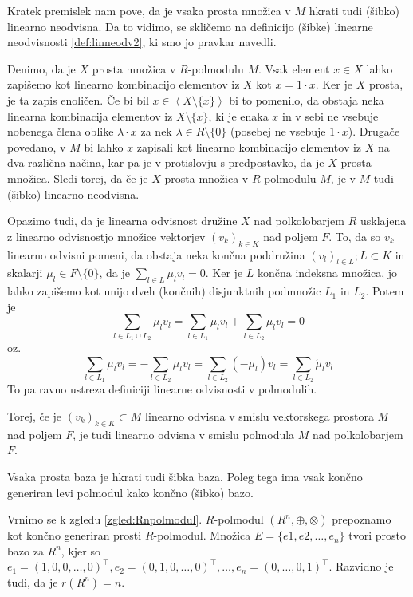 \documentclass[mat1]{fmfdelo}
\newcommand{\Gen}[1]{\ensuremath{\left<{#1}\right>}}
\begin{document}
Kratek premislek nam pove, da je vsaka prosta množica v $M$ hkrati tudi (šibko) linearno neodvisna. Da to vidimo, se skličemo na definicijo (šibke) linearne neodvisnosti \ref{def:linneodv2}, ki smo jo pravkar navedli.

Denimo, da je $X$ prosta množica v $R$-polmodulu $M$. Vsak element $x\in X$ lahko zapišemo kot linearno kombinacijo elementov iz $X$ kot $x = 1\cdot x$. Ker je $X$ prosta, je ta zapis enoličen. Če bi bil $x \in\Gen{X\setminus\{x\}}$ bi to pomenilo, da obstaja neka linearna kombinacija elementov iz $X\setminus\{x\}$, ki je enaka $x$ in v sebi ne vsebuje nobenega člena oblike $\lambda\cdot x$ za nek $\lambda\in R\setminus\{0\}$ (posebej ne vsebuje $1\cdot x$). Drugače povedano, v $M$ bi lahko $x$ zapisali kot linearno kombinacijo elementov iz $X$ na dva različna načina, kar pa je v protislovju s predpostavko, da je $X$ prosta množica. Sledi torej, da če je $X$ prosta množica v $R$-polmodulu $M$, je v $M$ tudi (šibko) linearno neodvisna.

Opazimo tudi, da je linearna odvisnost družine $X$ nad polkolobarjem $R$ usklajena z linearno odvisnostjo množice vektorjev $(v_k)_{k\in K}$ nad poljem $F$.
To, da so $v_k$ linearno odvisni pomeni, da obstaja neka končna poddružina $(v_l)_{l\in L}; L\subset K$ in skalarji $\mu_l\in F\setminus\{0\}$, da je $\sum_{l\in L}\mu_lv_l = 0$. Ker je $L$ končna indeksna množica, jo lahko zapišemo kot unijo dveh (končnih) disjunktnih podmnožic $L_1$ in $L_2$. Potem je $$ \sum_{l\in L_1\cup L_2} \mu_lv_l = \sum_{l\in L_1}\mu_lv_l + \sum_{l\in L_2}\mu_lv_l = 0$$ oz. $$\sum_{l\in L_1}\mu_lv_l = - \sum_{l\in L_2}\mu_lv_l = \sum_{l\in L_2} (-\mu_l)v_l = \sum_{l\in L_2}\acute{\mu}_lv_l $$
To pa ravno ustreza definiciji linearne odvisnosti v polmodulih. 

Torej, če je $(v_k)_{k\in K} \subset M$ linearno odvisna v smislu vektorskega prostora $M$ nad poljem $F$, je tudi linearno odvisna v smislu polmodula $M$ nad polkolobarjem $F$.

\begin{opomba}
	Vsaka prosta baza je hkrati tudi šibka baza. Poleg tega ima vsak končno generiran levi polmodul kako končno (šibko) bazo.
\end{opomba}

\begin{zgled}
	Vrnimo se k zgledu \ref{zgled:Rnpolmodul}. $R$-polmodul $(R^n, \oplus, \otimes)$ prepoznamo kot končno generiran prosti $R$-polmodul. Množica $E = \{e1, e2, \ldots, e_n\}$ tvori prosto bazo za $R^n$, kjer so $e_1 = (1, 0, 0, \ldots, 0)^\top, e_2 = (0, 1, 0, \ldots, 0)^\top, \ldots, e_n = (0, \ldots, 0, 1)^\top$. Razvidno je tudi, da je $r(R^n) = n$.
\end{zgled}
\end{document}
